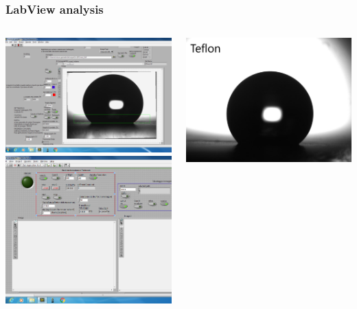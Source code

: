 \documentclass[xcolor=table]{beamer}
\begin{document}
\begin{frame}

\frametitle{LabView analysis}
\fontsize{8.5}{10.2} \selectfont

\begin{columns}
\begin{column}{.4\textwidth}
	\includegraphics[width=0.95\columnwidth]{analangolo.png}\\
	\medskip
	\includegraphics[width=0.95\columnwidth]{analisteresi.png}
\end{column}
\begin{column}{.5\textwidth}
	\includegraphics[width=0.5\columnwidth]{teflon_acqua_1.jpg}

\end{column}
\end{columns}
\end{frame}
\end{document}
